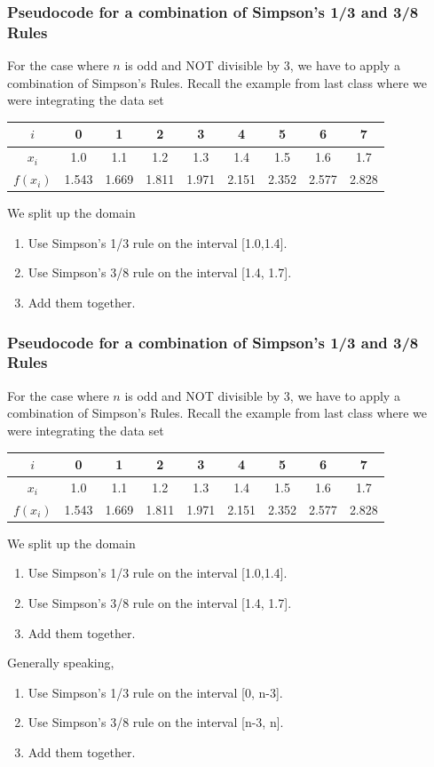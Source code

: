 \documentclass{if-beamer}
\begin{document}
\begin{frame}
	\frametitle{Pseudocode for a combination of Simpson's 1/3 and 3/8 Rules}
		For the case where $n$ is odd and NOT divisible by 3, we have to apply a combination of Simpson's Rules. Recall the example from last class where we were integrating the data set
	\begin{table}
		\begin{tabular}{c| c c c c c c c c}
			$i$ &0& 1&2&3&4&5&6&7 \\
			\hline
			$x_i$& 1.0 &1.1&1.2&1.3&1.4&1.5&1.6&1.7\\
			$f(x_i)$&1.543&1.669&1.811&1.971&2.151&2.352&2.577&2.828\\			
		\end{tabular}
	\end{table}
	We split up the domain
	\begin{enumerate}
		\item Use Simpson's 1/3 rule on the interval [1.0,1.4].
		\item Use Simpson's 3/8 rule on the interval [1.4, 1.7].
		\item Add them together.
	\end{enumerate}
\end{frame}

\begin{frame}
	\frametitle{Pseudocode for a combination of Simpson's 1/3 and 3/8 Rules}
	For the case where $n$ is odd and NOT divisible by 3, we have to apply a combination of Simpson's Rules. Recall the example from last class where we were integrating the data set
	\begin{table}
		\begin{tabular}{c| c c c c c c c c}
			$i$ &0& 1&2&3&4&5&6&7 \\
			\hline
			$x_i$& 1.0 &1.1&1.2&1.3&1.4&1.5&1.6&1.7\\
			$f(x_i)$&1.543&1.669&1.811&1.971&2.151&2.352&2.577&2.828\\			
		\end{tabular}
	\end{table}
	We split up the domain
	\begin{enumerate}
		\item Use Simpson's 1/3 rule on the interval [1.0,1.4].
		\item Use Simpson's 3/8 rule on the interval [1.4, 1.7].
		\item Add them together.
	\end{enumerate}
	Generally speaking,
	\begin{enumerate}
		\item Use Simpson's 1/3 rule on the interval [0, n-3].
		\item Use Simpson's 3/8 rule on the interval [n-3, n].
		\item Add them together.
	\end{enumerate}	
\end{frame}
\end{document}
